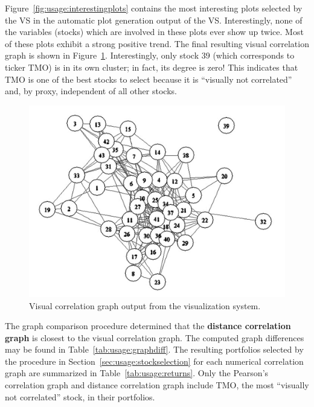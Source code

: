 \newpage
Figure~\ref{fig:usage:interestingplots} contains the most interesting plots 
selected by the VS in the automatic plot generation output of the VS. 
Interestingly, none of the variables (stocks) which are involved in these plots 
ever show up twice. Most of these plots exhibit a strong positive trend.
The final resulting visual correlation graph is shown in 
Figure~\ref{fig:usage:visg}. Interestingly, only stock 39 (which corresponds to 
ticker TMO) is in its own cluster; in fact, its degree is zero! This indicates 
that TMO is one of the best stocks to select because it is ``visually not 
correlated'' and, by proxy, independent of all other stocks.

\begin{figure}[H]
	\begin{center}
		\includegraphics[width=0.75\linewidth]
		{ch-usage/figures/visgraph}
		\caption[Visual correlation graph output from the visualization 
		system.]{Visual correlation
		graph output from the visualization system.}
		\label{fig:usage:visg}
	\end{center}
\end{figure}

The graph comparison procedure determined that the \textbf{distance correlation 
graph} is closest to the visual correlation graph. 
The computed graph differences may be found in Table~\ref{tab:usage:graphdiff}.
The resulting portfolios selected by the procedure in 
Section~\ref{sec:usage:stockselection} for each numerical correlation graph are 
summarized in Table~\ref{tab:usage:returns}. Only the Pearson's correlation 
graph and distance correlation graph include TMO, the most ``visually not 
correlated'' stock, in their portfolios. 

